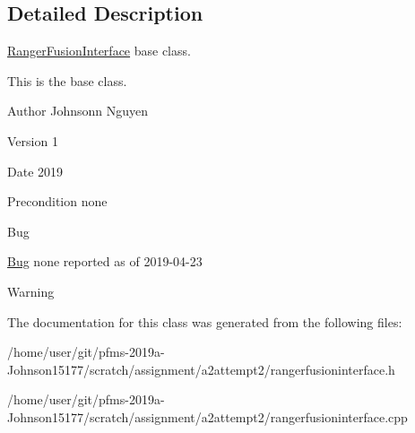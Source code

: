 \subsection{Detailed Description}
\hyperlink{classRangerFusionInterface}{Ranger\+Fusion\+Interface} base class. 

This is the base class.~\newline
\begin{DoxyAuthor}{Author}
Johnsonn Nguyen 
\end{DoxyAuthor}
\begin{DoxyVersion}{Version}
1 
\end{DoxyVersion}
\begin{DoxyDate}{Date}
2019 
\end{DoxyDate}
\begin{DoxyPrecond}{Precondition}
none 
\end{DoxyPrecond}
\begin{DoxyRefDesc}{Bug}
\item[\hyperlink{bug__bug000006}{Bug}]none reported as of 2019-\/04-\/23 \end{DoxyRefDesc}
\begin{DoxyWarning}{Warning}

\end{DoxyWarning}


The documentation for this class was generated from the following files\+:\begin{DoxyCompactItemize}
\item 
/home/user/git/pfms-\/2019a-\/\+Johnson15177/scratch/assignment/a2attempt2/rangerfusioninterface.\+h\item 
/home/user/git/pfms-\/2019a-\/\+Johnson15177/scratch/assignment/a2attempt2/rangerfusioninterface.\+cpp\end{DoxyCompactItemize}
